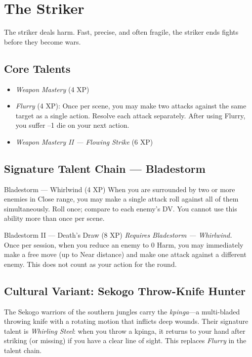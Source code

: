 \documentclass[9pt,a5paper]{extbook}
\begin{document}
\clearpage

\section{The Striker}

The striker deals harm. Fast, precise, and often fragile, the striker ends fights before they become wars.

\subsection{Core Talents}
\begin{itemize}
    \item \textit{Weapon Mastery} (4 XP)
    \item \textit{Flurry} (4 XP): Once per scene, you may make two attacks against the same target as a single action. Resolve each attack separately. After using Flurry, you suffer --1 die on your next action.
    \item \textit{Weapon Mastery II --- Flowing Strike} (6 XP)
\end{itemize}

\subsection{Signature Talent Chain --- Bladestorm}

\begin{talentbox}{Bladestorm --- Whirlwind (4 XP)}
When you are surrounded by two or more enemies in Close range, you may make a single attack roll against all of them simultaneously. Roll once; compare to each enemy's DV. You cannot use this ability more than once per scene.
\end{talentbox}

\begin{talentbox}{Bladestorm II --- Death's Draw (8 XP)}
\textit{Requires Bladestorm --- Whirlwind.} \\
Once per session, when you reduce an enemy to 0 Harm, you may immediately make a free move (up to Near distance) and make one attack against a different enemy. This does not count as your action for the round.
\end{talentbox}

\subsection{Cultural Variant: Sekogo Throw-Knife Hunter}
\label{culture:sekogo}
The Sekogo warriors of the southern jungles carry the \textit{kpinga}---a multi-bladed throwing knife with a rotating motion that inflicts deep wounds. Their signature talent is \textit{Whirling Steel}: when you throw a kpinga, it returns to your hand after striking (or missing) if you have a clear line of sight. This replaces \textit{Flurry} in the talent chain.
\end{document}
